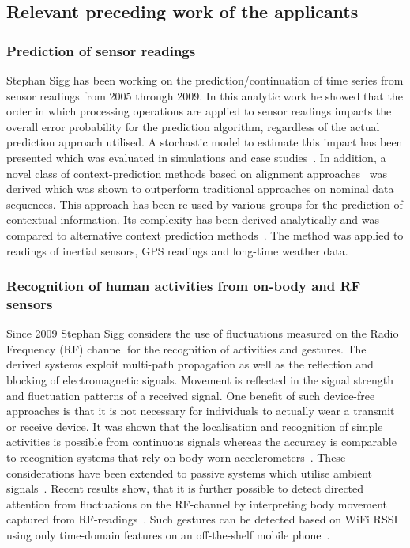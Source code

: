 \documentclass[12pt]{article}
\begin{document}
\subsection*{Relevant preceding work of the applicants}
\subsubsection*{Prediction of sensor readings}
Stephan Sigg has been working on the prediction/continuation of time series from sensor readings from 2005 through 2009. 
In this analytic work he showed that the order in which processing operations are applied to sensor readings impacts the overall error probability for the prediction algorithm, regardless of the actual prediction approach utilised.
A stochastic model to estimate this impact has been presented which was evaluated in simulations and case studies~\cite{4027}. 
In addition, a novel class of context-prediction methods based on alignment approaches~\cite{4026} was derived which was shown to outperform traditional approaches on nominal data sequences. 
This approach has been re-used by various groups for the prediction of contextual information.
Its complexity has been derived analytically and was compared to alternative context prediction methods~\cite{4027}. 
The method was applied to readings of inertial sensors, GPS readings and long-time weather data. 

\subsubsection*{Recognition of human activities from on-body and RF sensors}
Since 2009 Stephan Sigg considers the use of fluctuations measured on the Radio Frequency (RF) channel for the recognition of activities and gestures.
The derived systems exploit multi-path propagation as well as the reflection and blocking of electromagnetic signals.
Movement is reflected in the signal strength and fluctuation patterns of a received signal.
One benefit of such device-free approaches is that it is not necessary for individuals to actually wear a transmit or receive device.
It was shown that the localisation and recognition of simple activities is possible from continuous signals whereas the accuracy is comparable to recognition systems that rely on body-worn accelerometers~\cite{Pervasive_Sigg_2012}. 
These considerations have been extended to passive systems which utilise ambient signals~\cite{Pervasive_Sigg_2013}.
Recent results show, that it is further possible to detect directed attention from fluctuations on the RF-channel by interpreting body movement captured from RF-readings~\cite{Pervasive_Shi_2014}.
Such gestures can be detected based on WiFi RSSI using only time-domain features on an off-the-shelf mobile phone~\cite{RFSensing_Sigg_2014}.
\end{document}
